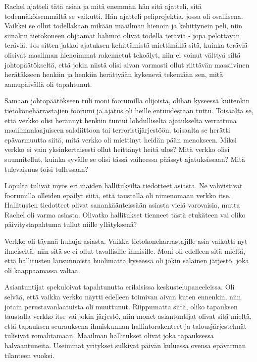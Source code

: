 \psep Rachel ajatteli tätä asiaa ja mitä enemmän hän sitä ajatteli, sitä todennäköisemmältä se vaikutti. Hän ajatteli peliprojektia, jossa oli osallisena. Vaikkei se ollut todellakaan mikään maailman hienoin ja kehittynein peli, niin siinäkin tietokoneen ohjaamat hahmot olivat todella teräviä - jopa pelottavan teräviä. Jos sitten jatkoi ajatuksen kehittämistä miettimällä sitä, kuinka teräviä olisivat maailman hienoimmat rakennetut tekoälyt, niin ei voinut välttyä siltä johtopäätökseltä, että jokin niistä olisi aivan varmasti ollut riittävän massiivinen herätäkseen henkiin ja henkiin herättyään kykenevä tekemään sen, mitä aamupäivällä oli tapahtunut.


Samaan johtopäätökseen tuli moni foorumilla olijoista, olihan kyseessä kuitenkin tietokoneharrastajien foorumi ja ajatus oli heille entuudestaan tuttu. Toisaalta se, että verkko olisi herännyt henkiin tuntui lohdulliselta ajatukselta verrattuna maailmanlaajuiseen salaliittoon tai terroristijärjestöön, toisaalta se herätti epävarmuutta siitä, mitä verkko oli miettinyt heidän pään menokseen. Miksi verkko ei vain yksinkertaisesti ollut heittänyt heitä ulos? Mitä verkko olisi suunnitellut, kuinka syvälle se olisi tässä vaiheessa päässyt ajatuksissaan? Mitä tulevaisuus toisi tullessaan?




\psep Lopulta tulivat myös eri maiden hallituksilta tiedotteet asiasta. Ne vahvistivat foorumilla olleiden epäilyt siitä, että taustalla oli nimenomaan verkko itse. Hallitusten tiedotteet olivat sanankäänteissään asiasta vielä varovaisia, mutta Rachel oli varma asiasta. Olivatko hallitukset tienneet tästä etukäteen vai oliko päivitystapahtuma tullut niille yllätyksenä?


Verkko oli täynnä huhuja asiasta. Vaikka tietokoneharrastajille asia vaikutti nyt ilmeiseltä, niin sitä se ei ollut tavallisille ihmisille. Moni oli edelleen sitä mieltä, että hallitusten lausunnoista huolimatta kyseessä oli jokin salainen järjestö, joka oli kaappaamassa valtaa.


Asiantuntijat spekuloivat tapahtunutta erilaisissa keskustelupaneeleissa. Oli selvää, että vaikka verkko näytti edelleen toimivan aivan kuten ennenkin, niin jotain perustavanlaatuista oli muuttunut. Riippumatta siitä, oliko tapauksen taustalla verkko itse vai jokin järjestö, niin monet asiantuntijat olivat sitä mieltä, että tapauksen seurauksena ihmiskunnan hallintorakenteet ja talousjärjestelmät tulisivat romahtamaan. Maailman hallitukset olivat joka tapauksessa halvaantuneita. Useimmat yritykset sulkivat päivän kuluessa ovensa epävarman tilanteen vuoksi.




